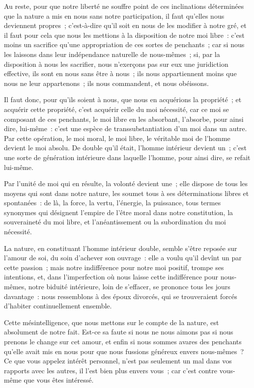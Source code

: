 \documentclass[french,twoside]{book} %
\begin{document}
Au reste, pour que notre liberté ne souffre point de ces inclinations déterminées que la nature a mis en nous sans notre participation, il faut qu’elles nous deviennent propres ; c’est-à-dire qu’il soit en nous de les modifier à notre gré, et il faut pour cela que nous les mettions à la disposition de notre moi libre : c’est moins un sacrifice qu’une appropriation de ces sortes de penchants ; car si nous les laissons dans leur indépendance naturelle de nous-mêmes ; si, par la disposition à nous les sacrifier, nous n’exerçons pas sur eux une juridiction effective, ils sont en nous sans être à nous ; ils nous appartiennent moins que nous ne leur appartenons ; ils nous commandent, et nous obéissons.\par
Il faut donc, pour qu’ils soient à nous, que nous en acquérions la propriété ; et acquérir cette propriété, c’est acquérir celle du moi nécessité, car ce moi se composant de ces penchants, le moi libre en les absorbant, l’absorbe, pour ainsi dire, lui-même : c’est une espèce de transsubstantiation d’un moi dans un autre. Par cette opération, le moi moral, le moi libre, le véritable moi de l’homme devient le moi absolu. De double qu’il était, l’homme intérieur devient un ; c’est une sorte de génération intérieure dans laquelle l’homme, pour ainsi dire, se refait lui-même.\par
Par l’unité de moi qui en résulte, la volonté devient une ; elle dispose de tous les moyens qui sont dans notre nature, les soumet tous à ses déterminations libres et spontanées : de là, la force, la vertu, l’énergie, la puissance, tous termes synonymes qui désignent l’empire de l’être moral dans notre constitution, la souveraineté du moi libre, et l’anéantissement ou la subordination du moi nécessité.\par
La nature, en constituant l’homme intérieur double, semble s’être reposée sur l’amour de soi, du soin d’achever son ouvrage : elle a voulu qu’il devînt un par cette passion ; mais notre indifférence pour notre moi positif, trompe ses intentions, et, dans l’imperfection où nous laisse cette indifférence pour nous-mêmes, notre biduité intérieure, loin de s’effacer, se prononce tous les jours davantage : nous ressemblons à des époux divorcés, qui se trouveraient forcés d’habiter continuellement ensemble.\par
Cette mésintelligence, que nous mettons sur le compte de la nature, est absolument de notre fait. Est-ce sa faute si nous ne nous aimons pas si nous prenons le change sur cet amour, et enfin si nous sommes avares des penchants qu’elle avait mis en nous pour que nous fussions généreux envers nous-mêmes ? Ce que vous appelez intérêt personnel, n’est pas seulement un mal dans vos rapports avec les autres, il l’est bien plus envers vous ; car c’est contre vous-même que vous êtes intéressé.\par
\end{document}
